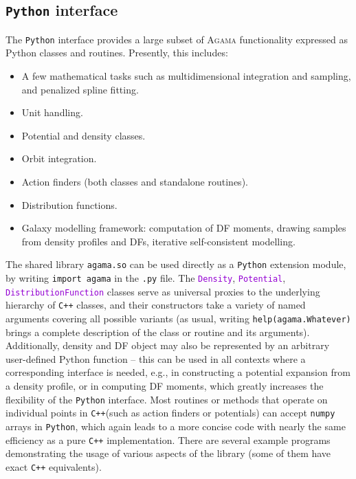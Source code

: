 \documentclass[12pt]{article}
\newcommand{\Agama}{\textsc{Agama}\xspace}
\newcommand{\Cpp}  {\texttt{C++}\xspace}
\newcommand{\Python}{\texttt{Python}\xspace}
\newcommand{\ttt}[1]{\textcolor{darkviolet}{\texttt{#1}}}
\begin{document}
\subsection{\Python interface}  \label{sec:Python}

The \Python interface provides a large subset of \Agama functionality expressed as Python classes and routines. Presently, this includes:
\begin{itemize}  \setlength{\parskip}{2pt} \setlength{\itemsep}{2pt}
\item A few mathematical tasks such as multidimensional integration and sampling, and penalized spline fitting.
\item Unit handling.
\item Potential and density classes.
\item Orbit integration.
\item Action finders (both classes and standalone routines).
\item Distribution functions.
\item Galaxy modelling framework: computation of DF moments, drawing samples from density profiles and DFs, iterative self-consistent modelling.
\end{itemize}

The shared library \texttt{agama.so} can be used directly as a \Python extension module, by writing \texttt{import agama} in the \texttt{.py} file. The \ttt{Density}, \ttt{Potential}, \ttt{DistributionFunction} classes serve as universal proxies to the underlying hierarchy of \Cpp classes, and their constructors take a variety of named arguments covering all possible variants (as usual, writing \texttt{help(agama.Whatever)} brings a complete description of the class or routine and its arguments). Additionally, density and DF object may also be represented by an arbitrary user-defined Python function -- this can be used in all contexts where a corresponding interface is needed, e.g., in constructing a potential expansion from a density profile, or in computing DF moments, which greatly increases the flexibility of the \Python interface. Most routines or methods that operate on individual points in \Cpp (such as action finders or potentials) can accept \texttt{numpy} arrays in \Python, which again leads to a more concise code with nearly the same efficiency as a pure \Cpp implementation. There are several example programs demonstrating the usage of various aspects of the library (some of them have exact \Cpp equivalents).

\end{document}
